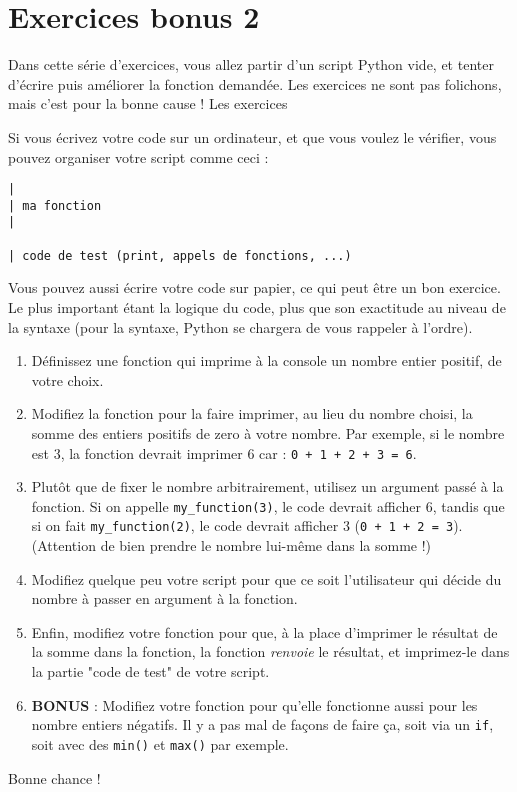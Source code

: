 \documentclass[12pt,a4paper]{article}
\newcommand{\codeintext}[1]{\texttt{#1}}
\begin{document}
\section*{Exercices bonus 2}

Dans cette série d'exercices, vous allez partir d'un script Python vide, et tenter d'écrire puis améliorer la fonction demandée. Les exercices ne sont pas folichons, mais c'est pour la bonne cause ! Les exercices 

Si vous écrivez votre code sur un ordinateur, et que vous voulez le vérifier, vous pouvez organiser votre script comme ceci :\\

\begin{lstlisting}
|
| ma fonction
|

| code de test (print, appels de fonctions, ...)
\end{lstlisting}

Vous pouvez aussi écrire votre code sur papier, ce qui peut être un bon exercice. Le plus important étant la logique du code, plus que son exactitude au niveau de la syntaxe (pour la syntaxe, Python se chargera de vous rappeler à l'ordre).

\begin{enumerate}

\item Définissez une fonction qui imprime à la console un nombre entier positif, de votre choix.

\item Modifiez la fonction pour la faire imprimer, au lieu du nombre choisi, la somme des entiers positifs de zero à votre nombre. Par exemple, si le nombre est 3, la fonction devrait imprimer 6 car : \codeintext{0 + 1 + 2 + 3 = 6}.

\item Plutôt que de fixer le nombre arbitrairement, utilisez un argument passé à la fonction. Si on appelle \codeintext{my\_function(3)}, le code devrait afficher 6, tandis que si on fait \codeintext{my\_function(2)}, le code devrait afficher 3 (\codeintext{0 + 1 + 2 = 3}). (Attention de bien prendre le nombre lui-même dans la somme !)

\item Modifiez quelque peu votre script pour que ce soit l'utilisateur qui décide du nombre à passer en argument à la fonction.

\item Enfin, modifiez votre fonction pour que, à la place d'imprimer le résultat de la somme dans la fonction, la fonction \emph{renvoie} le résultat, et imprimez-le dans la partie "code de test" de votre script.

\item \textbf{BONUS} : Modifiez votre fonction pour qu'elle fonctionne aussi pour les nombre entiers négatifs. Il y a pas mal de façons de faire ça, soit via un \codeintext{if}, soit avec des \codeintext{min()} et \codeintext{max()} par exemple. 

\end{enumerate}

Bonne chance !
\end{document}
